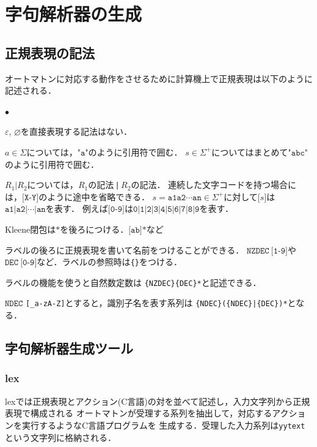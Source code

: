 \documentclass[dvipdfmx,a4j]{jbook}
\begin{document}
  \section{字句解析器の生成}

  \subsection{正規表現の記法}

  オートマトンに対応する動作をさせるために計算機上で正規表現は以下のように記述される．

  \begin{list}{$\bullet$}{}
    \item $\varepsilon$, $\varnothing$を直接表現する記法はない．
    \item $a\in\Sigma$については，$\texttt{"a"}$のように引用符で囲む．
    $s\in\Sigma^+$についてはまとめて$\texttt{"abc"}$のように引用符で囲む．
    \item $R_1|R_2$については，$R_1$の記法\,\texttt{|}\,$R_2$の記法．
    連続した文字コードを持つ場合には，$\texttt{[X-Y]}$のように途中を省略できる．
    $s=\texttt{a1}\texttt{a2}\cdots\texttt{an}\in\Sigma^+$に対して$\texttt{[}s\texttt{]}$は$\texttt{a1|a2|}\cdots\texttt{|an}$を表す．
    例えば$\texttt{[0-9]}$は$\texttt{0|1|2|3|4|5|6|7|8|9}$を表す．
    \item Kleene閉包は$\texttt{*}$を後ろにつける．$\texttt{[ab]*}$など
    \item ラベルの後ろに正規表現を書いて名前をつけることができる．
    $\texttt{NZDEC}\ \texttt{[1-9]}$や
    $\texttt{DEC}\ \texttt{[0-9]}$など．ラベルの参照時は\verb|{|\verb|}|をつける．
  \end{list}

  ラベルの機能を使うと自然数定数は \verb:{NZDEC}{DEC}*:と記述できる．

  $\texttt{NDEC}$ \verb:[_a-zA-Z]:とすると，識別子名を表す系列は
  \verb;{NDEC}({NDEC}|{DEC})*;となる．


  \subsection{字句解析器生成ツール}

  \subsubsection{lex}

  lexでは正規表現とアクション(C言語)の対を並べて記述し，入力文字列から正規表現で構成される
  オートマトンが受理する系列を抽出して，対応するアクションを実行するようなC言語プログラムを
  生成する．受理した入力系列は\texttt{yytext}という文字列に格納される．
\end{document}
